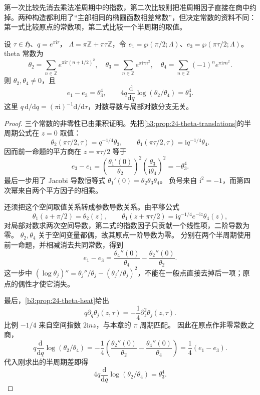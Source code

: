 第一次比较先消去乘法准周期中的指数，第二次比较则把准周期因子直接在商中约掉。两种构造都利用了“主部相同的椭圆函数相差常数”，但决定常数的资料不同：第一式比较原点的常数项，第二式比较一个半周期的取值。

\begin{lemma}[半周期差与参数导数]\label{b3:lem:24-half-period-derivative}
设 \(\tau\in\mathfrak H\)、\(q=e^{\pi\mathrm{i}\tau}\)，
\(\Lambda=\pi\mathbb Z+\pi\tau\mathbb Z\)，令
\(e_1=\wp(\pi/2;\Lambda)\)、\(e_3=\wp(\pi\tau/2;\Lambda)\)。
theta 常数为
\[
\theta_2=\sum_{n\in\mathbb Z}e^{\pi\mathrm{i}\tau(n+1/2)^2},
\quad
\theta_3=\sum_{n\in\mathbb Z}e^{\pi\mathrm{i}\tau n^2},
\quad
\theta_4=\sum_{n\in\mathbb Z}(-1)^ne^{\pi\mathrm{i}\tau n^2}.
\]
则 \(\theta_2,\theta_4\ne0\)，且
\[
e_1-e_3=\theta_3^4,\qquad
4q\frac{\mathrm d}{\mathrm dq}\log(\theta_2/\theta_4)=\theta_3^4.
\]
这里 \(q\,\mathrm d/\mathrm dq=(\pi\mathrm{i})^{-1}\mathrm d/\mathrm d\tau\)，对数导数与局部对数分支无关。
\end{lemma}
\begin{proof}
三个常数的非零性已由乘积证明。先把\cref{b3:prop:24-theta-translations}的半周期公式在 \(z=0\) 取值：
\[
\theta_2(\pi\tau/2,\tau)=q^{-1/4}\theta_3,\qquad
\theta_1(\pi\tau/2,\tau)=\mathrm{i}q^{-1/4}\theta_4.
\]
因而前一命题的平方商在 \(z=\pi\tau/2\) 等于
\[
e_3-e_1
=\left(\frac{\theta_1'(0)}{\theta_2}\right)^2
  \left(\frac{\theta_3}{\mathrm{i}\theta_4}\right)^2
=-\theta_3^4.
\]
最后一步用了 Jacobi 导数恒等式
\(\theta_1'(0)=\theta_2\theta_3\theta_4\)。
负号来自 \(\mathrm{i}^2=-1\)，而第四次幂来自两个平方因子的相乘。

还须把这个空间取值关系转成参数导数关系。由平移公式
\[
\theta_1(z+\pi/2)=\theta_2(z),\qquad
\theta_1(z+\pi\tau/2)
=\mathrm{i}q^{-1/4}e^{-\mathrm{i}z}\theta_4(z),
\]
对局部对数求两次空间导数，第二式的指数因子只贡献一个线性项，二阶导数为零。
\(\theta_2,\theta_4\) 关于空间变量都偶，故其原点一阶导数为零。
分别在两个半周期使用前一命题，并相减消去共同常数，得到
\[
e_1-e_3
=\frac{\theta_4''(0)}{\theta_4}
 -\frac{\theta_2''(0)}{\theta_2}.
\]
这一步中 \((\log\theta_j)''=\theta_j''/\theta_j-(\theta_j'/\theta_j)^2\)，不能在一般点直接去掉后一项；原点的偶性才使它消失。

最后，\cref{b3:prop:24-theta-heat}给出
\[
q\partial_q\theta_j(z,\tau)=-\frac14\partial_z^2\theta_j(z,\tau).
\]
比例 \(-1/4\) 来自空间指数 \(2\mathrm{i}nz\)，与本章的 \(\pi\) 周期匹配。
因此在原点作非零常数之商，
\[
q\frac{\mathrm d}{\mathrm dq}\log(\theta_2/\theta_4)
=-\frac14\left(
\frac{\theta_2''(0)}{\theta_2}-\frac{\theta_4''(0)}{\theta_4}\right)
=\frac14(e_1-e_3).
\]
代入刚求出的半周期差即得
\begin{equation}\label{b3:eq:24-log-derivative}
4q\frac{\mathrm d}{\mathrm dq}\log(\theta_2/\theta_4)=\theta_3^4.
\end{equation}
\end{proof}

